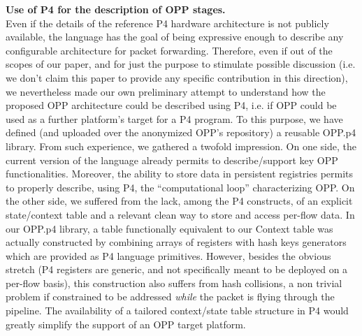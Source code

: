 \documentclass{sig-alternate}
\begin{document}
\vspace{3pt} \noindent \textbf{Use of P4 for the description of OPP stages.} \\
Even if the details of the reference P4 hardware architecture is not publicly available, the language has the goal of being expressive enough to describe any configurable architecture for packet forwarding. Therefore, even if out of the scopes of our paper, and for just the purpose to stimulate possible discussion (i.e. we don't claim this paper to provide any specific contribution in this direction), we nevertheless made our own preliminary attempt to understand how the proposed OPP architecture could be described using P4, i.e. if OPP could be used as a further platform's target for a P4 program. To this purpose, we have defined (and uploaded over the anonymized OPP's repository) a reusable OPP.p4 library. From such experience, we gathered a twofold impression. On one side, the current version of the language already permits to describe/support key OPP functionalities. Moreover, the ability to store data in persistent registries permits to properly describe, using P4, the ``computational loop'' characterizing OPP. 
On the other side, we suffered from the lack, among the P4 constructs, of an explicit state/context table and a relevant clean way to store and access per-flow data. In our OPP.p4 library, a table functionally equivalent to our Context table was actually constructed by combining arrays of registers with hash keys generators which are provided as P4 language primitives. However, besides the obvious stretch (P4 registers are generic, and not specifically meant to be deployed on a per-flow basis), this construction also suffers from hash collisions, a non trivial problem if constrained to be addressed {\em while} the packet is flying through the pipeline. The availability of a tailored context/state table structure in P4 would greatly simplify the support of an OPP target platform.
\end{document}
